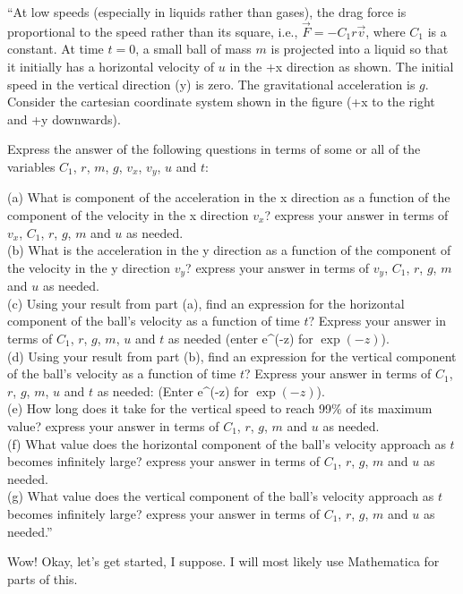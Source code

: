 \documentclass[12pt,a4paper]{report}
\begin{document}
``At low speeds (especially in liquids rather than gases), the drag force is proportional to the speed rather than its square, i.e., $\vec{F} = -C_1 r \vec{v}$, where $C_1$ is a constant. At time $t = 0$, a small ball of mass $m$ is projected into a liquid so that it initially has a horizontal velocity of $u$ in the +x direction as shown. The initial speed in the vertical direction (y) is zero. The gravitational acceleration is $g$. Consider the cartesian coordinate system shown in the figure (+x to the right and +y downwards).

Express the answer of the following questions in terms of some or all of the variables $C_1$, $r$, $m$, $g$, $v_x$, $v_y$, $u$ and $t$:

(a) What is component of the acceleration in the x direction as a function of the component of the velocity in the x direction $v_x$? express your answer in terms of $v_x$, $C_1$, $r$, $g$, $m$ and $u$ as needed.\\
(b) What is the acceleration in the y direction as a function of the component of the velocity in the y direction $v_y$? express your answer in terms of $v_y$, $C_1$, $r$, $g$, $m$ and $u$ as needed.\\
(c) Using your result from part (a), find an expression for the horizontal component of the ball's velocity as a function of time $t$? Express your answer in terms of $C_1$, $r$, $g$, $m$, $u$ and $t$ as needed (enter e\textasciicircum(-z) for $\exp(-z)$).\\
(d) Using your result from part (b), find an expression for the vertical component of the ball's velocity as a function of time $t$? Express your answer in terms of $C_1$, $r$, $g$, $m$, $u$ and $t$ as needed: (Enter e\textasciicircum(-z) for $\exp(-z)$).\\
(e) How long does it take for the vertical speed to reach 99\% of its maximum value? express your answer in terms of $C_1$, $r$, $g$, $m$ and $u$ as needed.\\
(f) What value does the horizontal component of the ball's velocity approach as $t$ becomes infinitely large? express your answer in terms of $C_1$, $r$, $g$, $m$ and $u$ as needed.\\
(g) What value does the vertical component of the ball's velocity approach as $t$ becomes infinitely large? express your answer in terms of $C_1$, $r$, $g$, $m$ and $u$ as needed.''

Wow! Okay, let's get started, I suppose. I will most likely use Mathematica for parts of this.
\end{document}
